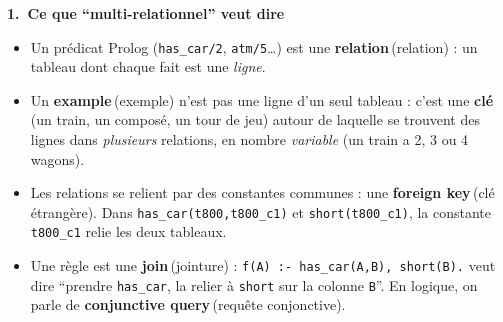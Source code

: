 \documentclass[10pt]{article}
\newcommand{\EN}[2]{\textbf{#1}\,{\scriptsize\textcolor{marine}{(#2)}}}
\newcommand{\titrebox}[2]{\needspace{10\baselineskip}\vspace{8pt}
  \begin{tcolorbox}[colback=marine, colframe=marine, arc=0pt, boxrule=0pt,
    top=4pt, bottom=4pt, left=8pt]
  \color{white}\Large\bfseries #1.~#2
  \end{tcolorbox}\vspace{2pt}}
\begin{document}
\titrebox{1}{Ce que ``multi-relationnel'' veut dire}
\begin{itemize}
  \item Un prédicat Prolog (\texttt{has\_car/2}, \texttt{atm/5}\ldots) est une \EN{relation}{relation} : un tableau dont chaque fait est une \emph{ligne}.
  \item Un \EN{example}{exemple} n'est pas une ligne d'un seul tableau : c'est une \textbf{clé} (un train, un composé, un tour de jeu) autour de laquelle se trouvent des lignes dans \emph{plusieurs} relations, en nombre \emph{variable} (un train a 2, 3 ou 4 wagons).
  \item Les relations se relient par des constantes communes : une \EN{foreign key}{clé étrangère}. Dans \texttt{has\_car(t800,t800\_c1)} et \texttt{short(t800\_c1)}, la constante \texttt{t800\_c1} relie les deux tableaux.
  \item Une règle est une \EN{join}{jointure} : \texttt{f(A) :- has\_car(A,B), short(B).} veut dire ``prendre \texttt{has\_car}, la relier à \texttt{short} sur la colonne \texttt{B}''. En logique, on parle de \EN{conjunctive query}{requête conjonctive}.
\end{itemize}
\end{document}
